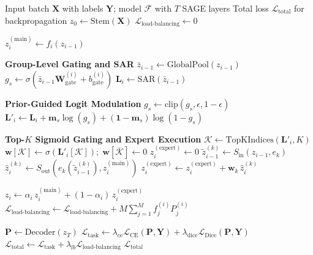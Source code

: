 \begin{algorithm}[!t]
\caption{\textbf{SAGE Training Algorithm (per mini-batch)}}
\label{alg:sage}
\begin{algorithmic}[1]
\Require Input batch $\mathbf{X}$ with labels $\mathbf{Y}$; model $\mathcal{F}$ with $T$ SAGE layers
\Ensure Total loss $\mathcal{L}_{\text{total}}$ for backpropagation
\State $z_0 \gets \text{Stem}(\mathbf{X})$
\State $\mathcal{L}_{\text{load-balancing}} \gets 0$

    \State $z_i^{(\text{main})} \gets f_i(z_{i-1})$

    \Statex \textbf{Group-Level Gating and SAR}
    \State $\bar{z}_{i-1} \gets \text{GlobalPool}(z_{i-1})$
    \State $g_s \gets \sigma(\bar{z}_{i-1}\mathbf{W}_{\text{gate}}^{(i)} + b_{\text{gate}}^{(i)})$
    \State $\mathbf{L}_i \gets \text{SAR}(\bar{z}_{i-1})$

    \Statex \textbf{Prior-Guided Logit Modulation}
    \State $g_s \gets \text{clip}(g_s, \epsilon, 1-\epsilon)$
    \State $\mathbf{L}'_i \gets \mathbf{L}_i + \mathbf{m}_s\log(g_s) + (\mathbf{1}-\mathbf{m}_s)\log(1-g_s)$

    \Statex \textbf{Top-$K$ Sigmoid Gating and Expert Execution}
    \State $\mathcal{K} \gets \text{TopKIndices}(\mathbf{L}'_i, K)$
    \State $\mathbf{w}[\mathcal{K}] \gets \sigma(\mathbf{L}'_i[\mathcal{K}]);\; \mathbf{w}[\overline{\mathcal{K}}] \gets 0$
    \State $z_i^{(\text{expert})} \gets 0$
        \State $\tilde{z}_{i-1}^{(k)} \gets S_{\text{in}}(z_{i-1}, e_k)$
        \State $\hat{z}_i^{(k)} \gets S_{\text{out}}(e_k(\tilde{z}_{i-1}^{(k)}), z_i^{(\text{main})})$
        \State $z_i^{(\text{expert})} \gets z_i^{(\text{expert})} + \mathbf{w}_k\,\hat{z}_i^{(k)}$
    \EndFor

    \State $z_i \gets \alpha_i\,z_i^{(\text{main})} + (1-\alpha_i)\,z_i^{(\text{expert})}$
    \State $\mathcal{L}_{\text{load-balancing}} \gets \mathcal{L}_{\text{load-balancing}} + M\sum_{j=1}^{M} f_j^{(i)}P_j^{(i)}$
\EndFor

\State $\mathbf{P} \gets \text{Decoder}(z_T)$
\State $\mathcal{L}_{\text{task}} \gets \lambda_{\text{ce}}\mathcal{L}_{\text{CE}}(\mathbf{P},\mathbf{Y}) + \lambda_{\text{dice}}\mathcal{L}_{\text{Dice}}(\mathbf{P},\mathbf{Y})$
\State $\mathcal{L}_{\text{total}} \gets \mathcal{L}_{\text{task}} + \lambda_{lb}\mathcal{L}_{\text{load-balancing}}$
\State \Return $\mathcal{L}_{\text{total}}$
\end{algorithmic}
\end{algorithm}

